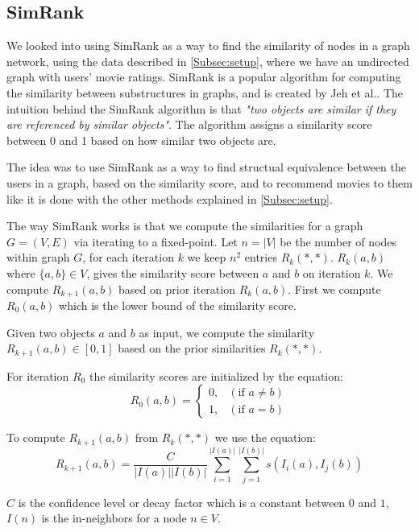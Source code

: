 \subsection{SimRank}
\label{Subsec:SimRank}
We looked into using SimRank as a way to find the similarity of nodes in a graph network, using the data described in \autoref{Subsec:setup}, where we have an undirected graph with users' movie ratings.
SimRank is a popular algorithm for computing the similarity between substructures in graphs, and is created by Jeh et al.\cite{10.1145/775047.775126}.
The intuition behind the SimRank algorithm is that \emph{"two objects are similar if they are referenced by similar objects"}\cite{10.1145/775047.775126}. The algorithm assigns a similarity score between 0 and 1 based on how similar two objects are.

The idea was to use SimRank as a way to find structual equivalence between the users in a graph, based on the similarity score, and to recommend movies to them like it is done with the other methods explained in \autoref{Subsec:setup}.

The way SimRank works is that we compute the similarities for a graph $G = (V,E)$ via iterating to a fixed-point. 
Let $n = |V|$ be the number of nodes within graph $G$, for each iteration $k$ we keep $n^2$ entries $R_k(*,*)$.
$R_k(a,b)$ where $\{a,b\} \in V$, gives the similarity score between $a$ and $b$ on iteration $k$\cite{10.1145/775047.775126}.
We compute $R_{k+1}(a,b)$ based on prior iteration $R_k(a,b)$.
First we compute $R_0(a,b)$ which is the lower bound of the similarity score.

\begin{definition}[SimRank]\label{def:simrank} Given two objects $a$ and $b$ as input, we compute the similarity $R_{k+1}(a,b) \in [0,1]$ based on the prior similarities $R_k(*,*)$.

For iteration $R_0$ the similarity scores are initialized by the equation:
\begin{equation}\label{eq:lowerbound_sim_score}
R_0(a,b)= \begin{cases}
0, & (\text{if } a \neq b) \\

1 ,& (\text{if } a = b)
\end{cases}
\end{equation}

To compute $R_{k+1}(a,b)$ from $R_k(*,*)$ we use the equation:
\begin{equation}\label{eq:simrank_computation}
R_{k+1}(a,b)= \frac{C}{|I(a)||I(b)|}\sum^{|I(a)|}_{i=1}\sum^{|I(b)|}_{j=1}s(I_i(a),I_j(b))
\end{equation}

$C$ is the confidence level or decay factor which is a constant between $0$ and $1$, $I(n)$ is the in-neighbors for a node $n \in V$.

\end{definition}

